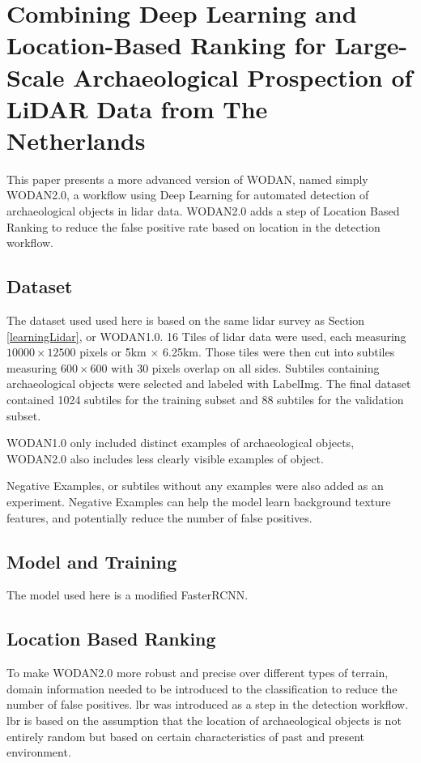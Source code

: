\section{Combining Deep Learning and Location-Based Ranking for Large-Scale Archaeological Prospection of LiDAR Data from The Netherlands}
This paper presents a more advanced version of WODAN, named simply WODAN2.0, a workflow using Deep Learning for automated detection of archaeological objects in \gls{lidar} data. WODAN2.0 adds a step of Location Based Ranking to reduce the false positive rate based on location in the detection workflow. 

\subsection{Dataset}
The dataset used used here is based on the same \gls{lidar} survey as Section \ref{learningLidar}, or WODAN1.0. 16 Tiles of \gls{lidar} data were used, each measuring $10000 \times 12500$ pixels or 5km $\times$ 6.25km. Those tiles were then cut into subtiles measuring $600 \times 600$ with 30 pixels overlap on all sides. Subtiles containing archaeological objects were selected and labeled with LabelImg. The final dataset contained 1024 subtiles for the training subset and 88 subtiles for the validation subset. 

WODAN1.0 only included distinct examples of archaeological objects, WODAN2.0 also includes less clearly visible examples of object. 

Negative Examples, or subtiles without any examples were also added as an experiment. Negative Examples can help the model learn background texture features, and potentially reduce the number of false positives.

\subsection{Model and Training}
The model used here is a modified FasterRCNN\cite{FasterRCNN}. 

\subsection{Location Based Ranking}
To make WODAN2.0 more robust and precise over different types of terrain, domain information needed to be introduced to the classification to reduce the number of false positives. \gls{lbr} was introduced as a step in the detection workflow. \gls{lbr} is based on the assumption that the location of archaeological objects is not entirely random but based on certain characteristics of past and present environment. 

